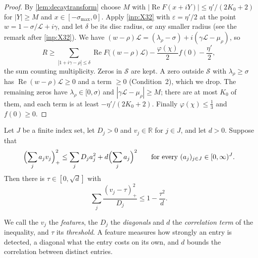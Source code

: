 \documentclass[11pt]{amsart}
\numberwithin{equation}{section}
\theoremstyle{plain}
\theoremstyle{definition}
\theoremstyle{remark}
\newcommand{\LL}{\mathcal{L}}
\newcommand{\RR}{\mathbb{R}}
\renewcommand{\Re}{\operatorname{Re}}
\newcommand{\cS}{\mathcal{S}}
\newcommand{\eps}{\varepsilon}
\newcommand{\1}{\mathbf{1}}
\begin{document}
\begin{proof}
By \cref{lem:decaytransform} choose $M$ with $|\Re F(x+iY)|\le\eta'/(2K_0+2)$ for $|Y|\ge M$ and
$x\in[-\sigma_{\max},0]$. Apply \cref{inp:X32} with $\eps=\eta'/2$ at the point
$w=1-\sigma/\LL+i\gamma$, and let $\delta$ be its disc radius, or any smaller radius (see the remark after
\cref{inp:X32}). We have $(w-\rho)\LL=
(\lambda_\rho-\sigma)+i(\gamma\LL-\mu_\rho)$, so
\[
  R\ge\sum_{|1+i\gamma-\rho|\le\delta}\Re F\bigl((w-\rho)\LL\bigr)-\frac{\varphi(\chi)}2f(0)-\frac{\eta'}2 ,
\]
the sum counting multiplicity. Zeros in $\cS$ are kept. A zero outside $\cS$ with
$\lambda_\rho\ge\sigma$ has $\Re(w-\rho)\LL\ge0$ and a term $\ge0$ (Condition~2), which we drop. The
remaining zeros have $\lambda_\rho\in[0,\sigma)$ and $|\gamma\LL-\mu_\rho|\ge M$; there are at most $K_0$
of them, and each term is at least $-\eta'/(2K_0+2)$. Finally $\varphi(\chi)\le\frac13$ and
$f(0)\ge0$.
\end{proof}

\begin{proposition}\label{prop:threshold}
Let $J$ be a finite index set, let $D_j>0$ and $v_j\in\RR$ for $j\in J$, and let $d>0$.
Suppose that
\[
  \Bigl(\sum_j a_jv_j\Bigr)_+^2\le\sum_jD_ja_j^2+d\Bigl(\sum_j a_j\Bigr)^2
  \qquad\text{for every }(a_j)_{j\in J}\in[0,\infty)^J.
\]
Then there is
$\tau\in[0,\sqrt d]$ with
\begin{equation}\label{eq:T}\tag{T}
  \sum_j\frac{(v_j-\tau)_+^2}{D_j}\le1-\frac{\tau^2}d .
\end{equation}
\end{proposition}

We call the $v_j$ the \emph{features}, the $D_j$ the \emph{diagonals} and $d$ the \emph{correlation term}
of the inequality, and $\tau$ its \emph{threshold}. A feature measures how strongly an entry is
detected, a diagonal what the entry costs on its own, and $d$ bounds the correlation between
distinct entries.
\end{document}
